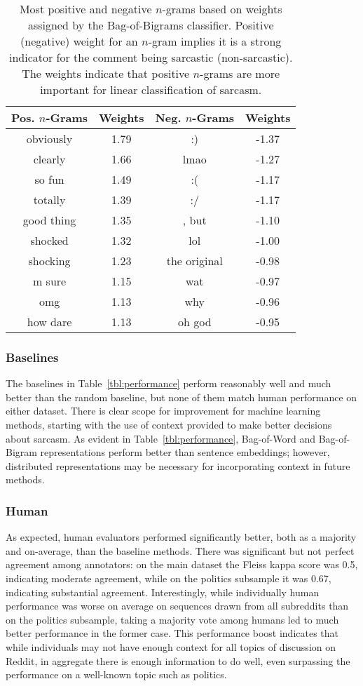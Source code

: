 \documentclass[10pt, a4paper]{article}
\begin{document}
\begin{table}
	\centering
	\begin{tabular}{c c c c}
		Pos. $n$-Grams & Weights & Neg. $n$-Grams & Weights\\
		\toprule
		obviously & 1.79 & :) & -1.37\\
		clearly & 1.66 & lmao & -1.27\\
		so fun & 1.49 & :( & -1.17\\
		totally & 1.39 & :/ & -1.17\\
		good thing & 1.35 & , but & -1.10\\
		shocked & 1.32 & lol & -1.00\\
		shocking & 1.23 & the original & -0.98\\
		m sure & 1.15 & wat & -0.97\\
		omg & 1.13 & why & -0.96\\
		how dare & 1.13 & oh god & -0.95\\
	\end{tabular}
	\caption{Most positive and negative $n$-grams based on weights assigned by the Bag-of-Bigrams classifier. Positive (negative) weight for an $n$-gram implies it is a strong indicator for the comment being sarcastic (non-sarcastic). The weights indicate that positive $n$-grams are more important for linear classification of sarcasm.}
\end{table}

\subsubsection{Baselines}
The baselines in Table~\ref{tbl:performance} perform reasonably well and much better than the random baseline, but none of them match human performance on either dataset. There is clear scope for improvement for machine learning methods, starting with the use of context provided to make better decisions about sarcasm. As evident in Table~\ref{tbl:performance}, Bag-of-Word and Bag-of-Bigram representations perform better than sentence embeddings; however, distributed representations may be necessary for incorporating context in future methods.

\subsubsection{Human}
As expected, human evaluators performed significantly better, both as a majority and on-average, than the baseline methods. There was significant but not perfect agreement among annotators: on the main dataset the Fleiss kappa score \cite{Fleiss:71} was 0.5, indicating moderate agreement, while on the politics subsample it was 0.67, indicating substantial agreement. Interestingly, while individually human performance was worse on average on sequences drawn from all subreddits than on the politics subsample, taking a majority vote among humans led to much better performance in the former case. This performance boost indicates that while individuals may not have enough context for all topics of discussion on Reddit, in aggregate there is enough information to do well, even surpassing the performance on a well-known topic such as politics.
 
\end{document}
